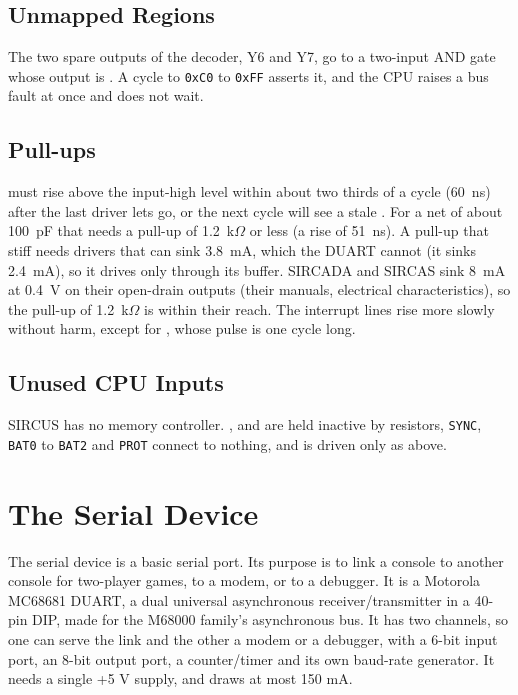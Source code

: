 \subsection{Unmapped Regions}

The two spare outputs of the decoder, Y6 and Y7, go to a two-input AND gate whose output is . A cycle
to \texttt{0xC0} to \texttt{0xFF} asserts it, and the CPU raises a bus fault at once and does not wait.

\subsection{Pull-ups}

 must rise above the input-high level within about two thirds of a cycle (60~ns) after the last driver lets go, or the next
cycle will see a stale . For a net of about 100~pF that needs a pull-up of 1.2~k$\Omega$ or less (a rise of 51~ns). A pull-up that
stiff needs drivers that can sink 3.8~mA, which the DUART cannot (it sinks 2.4~mA), so it drives  only through its
buffer. SIRCADA and SIRCAS sink 8~mA at 0.4~V on their open-drain outputs (their manuals, electrical characteristics), so the pull-up of 1.2~k$\Omega$ is within their reach. The interrupt lines
rise more slowly without harm, except for , whose pulse is one cycle long.

\subsection{Unused CPU Inputs}

SIRCUS has no memory controller. ,  and  are held inactive by
resistors, \texttt{SYNC}, \texttt{BAT0} to \texttt{BAT2} and \texttt{PROT} connect to nothing, and  is
driven only as above.

\section{The Serial Device}
\label{sec:serial-device}

The serial device is a basic serial port. Its purpose is to link a console to another console for two-player games, to
a modem, or to a debugger. It is a Motorola MC68681 DUART, a dual universal asynchronous receiver/transmitter in a
40-pin DIP, made for the M68000 family's asynchronous bus. It has two channels, so one can serve the link and the other
a modem or a debugger, with a 6-bit input port, an 8-bit output port, a counter/timer and its own baud-rate generator.
It needs a single +5 V supply, and draws at most 150 mA.


